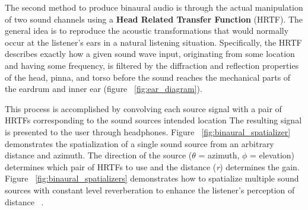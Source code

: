 The second method to produce binaural audio is through the actual manipulation
of two sound channels using a \textbf{Head Related Transfer Function} (HRTF).
The general idea is to reproduce the acoustic transformations that would
normally occur at the listener's ears in a natural listening situation.
Specifically, the HRTF describes exactly how a given sound wave input,
originating from some location and having some frequency, is filtered by the
diffraction and reflection properties of the head, pinna, and torso before the
sound reaches the mechanical parts of the eardrum and inner ear (figure
~\ref{fig:ear_diagram}).


This process is accomplished by convolving each source signal with a pair of
HRTFs corresponding to the sound sources intended location The resulting
signal is presented to the user through headphones. Figure
~\ref{fig:binaural_spatializer} demonstrates the spatialization of a single
sound source from an arbitrary distance and azimuth. The direction of the
source ($\theta$ = azimuth, $\phi$ = elevation) determines which pair of HRTFs
to use and the distance (\textit{r}) determines the gain. Figure
~\ref{fig:binaural_spatializers} demonstrates how to spatialize multiple sound
sources with constant level reverberation to enhance the listener's perception
of distance ~\cite{gardner1995transaural}.


